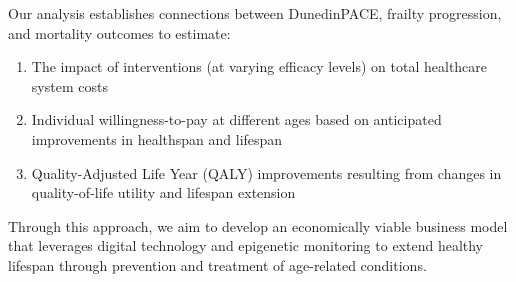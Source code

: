 \documentclass[12pt,a4paper]{article}
\begin{document}
Our analysis establishes connections between DunedinPACE, frailty progression, and mortality outcomes to estimate:

\begin{enumerate}
    \item The impact of interventions (at varying efficacy levels) on total healthcare system costs
    \item Individual willingness-to-pay at different ages based on anticipated improvements in healthspan and lifespan
    \item Quality-Adjusted Life Year (QALY) improvements resulting from changes in quality-of-life utility and lifespan extension
\end{enumerate}

Through this approach, we aim to develop an economically viable business model that leverages digital technology and epigenetic monitoring to extend healthy lifespan through prevention and treatment of age-related conditions.









\end{document}
